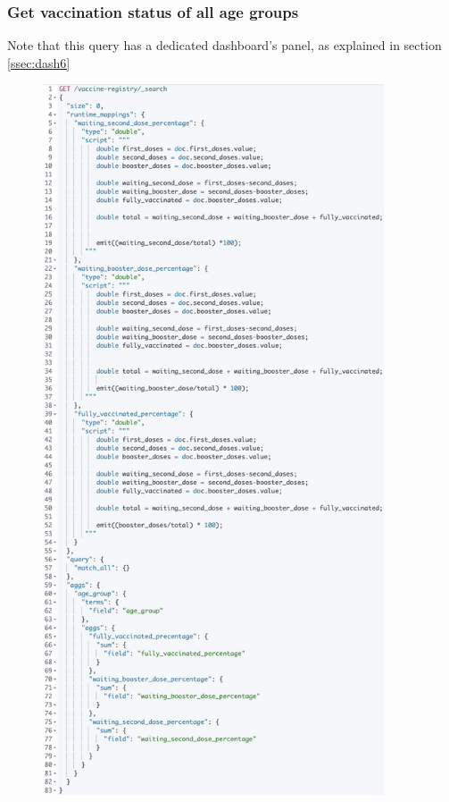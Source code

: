 \documentclass{article}[IEEEtran]
\begin{document}
\newpage

\subsubsection{Get vaccination status of all age groups}\label{ssec:q6}


Note that this query has a dedicated dashboard's panel, as explained in section \ref{ssec:dash6}

\begin{figure}[H]
\begin{center}
\begin{minipage}[b]{0.4\textwidth}
    \includegraphics[width=0.9\textwidth, frame]{Query_9BIS.png}

\end{minipage}
\end{center}
\end{figure}
\end{document}
